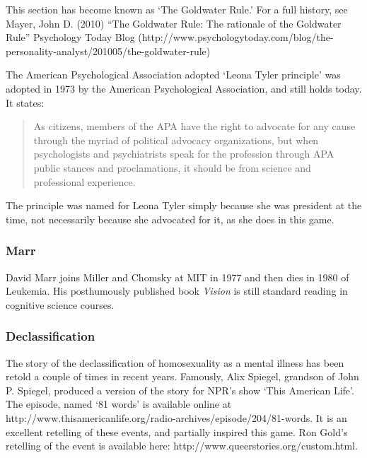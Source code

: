 This section has become known as `The Goldwater Rule.' For a full history, see Mayer, John D. (2010) ``The Goldwater Rule: The rationale of the Goldwater Rule'' Psychology Today Blog (http:\slash \slash www.psychologytoday.com\slash blog\slash the-personality-analyst\slash 201005\slash the-goldwater-rule)

The American Psychological Association adopted `Leona Tyler principle' was adopted in 1973 by the American Psychological Association, and still holds today. It states:

\begin{quote}

As citizens, members of the APA have the right to advocate for any cause through the myriad of political advocacy organizations, but when psychologists and psychiatrists speak for the profession through APA public stances and proclamations, it should be from science and professional experience. 
\end{quote}

The principle was named for Leona Tyler simply because she was president at the time, not necessarily because she advocated for it, as she does in this game. 

\subsubsection{Marr}
\label{marr}

David Marr joins Miller and Chomsky at MIT in 1977 and then dies in 1980 of Leukemia. His posthumously published book \emph{Vision} is still standard reading in cognitive science courses.

\subsubsection{Declassification}
\label{declassification}

The story of the declassification of homosexuality as a mental illness has been retold a couple of times in recent years. Famously, Alix Spiegel, grandson of John P. Spiegel, produced a version of the story for NPR's show `This American Life'. The episode, named `81 words' is available online at http:\slash \slash www.thisamericanlife.org\slash radio-archives\slash episode\slash 204\slash 81-words. It is an excellent retelling of these events, and partially inspired this game. Ron Gold's retelling of the event is available here: http:\slash \slash www.queerstories.org\slash custom.html.

